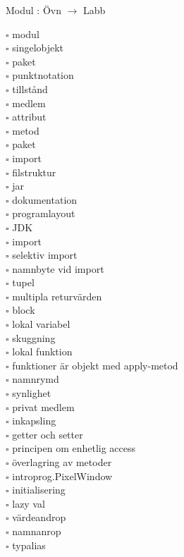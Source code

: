 
    Modul : Övn  $\rightarrow$ Labb 
    \begin{multicols}{3}\SlideFontTiny
    $\square$ modul \\
$\square$ singelobjekt \\
$\square$ paket \\
$\square$ punktnotation \\
$\square$ tillstånd \\
$\square$ medlem \\
$\square$ attribut \\
$\square$ metod \\
$\square$ paket \\
$\square$ import \\
$\square$ filstruktur \\
$\square$ jar \\
$\square$ dokumentation \\
$\square$ programlayout \\
$\square$ JDK \\
$\square$ import \\
$\square$ selektiv import \\
$\square$ namnbyte vid import \\
$\square$ tupel \\
$\square$ multipla returvärden \\
$\square$ block \\
$\square$ lokal variabel \\
$\square$ skuggning \\
$\square$ lokal funktion \\
$\square$ funktioner är objekt med apply-metod \\
$\square$ namnrymd \\
$\square$ synlighet \\
$\square$ privat medlem \\
$\square$ inkapsling \\
$\square$ getter och setter \\
$\square$ principen om enhetlig access \\
$\square$ överlagring av metoder \\
$\square$ introprog.PixelWindow \\
$\square$ initialisering \\
$\square$ lazy val \\
$\square$ värdeandrop \\
$\square$ namnanrop \\
$\square$ typalias \\
    \end{multicols}
    